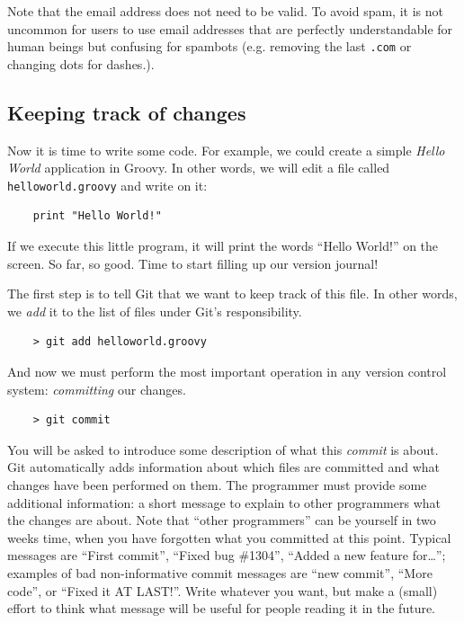 Note that the email address does not need to be valid. To avoid spam,
it is not uncommon for users to use email addresses that are perfectly
understandable for human beings but confusing for spambots
(e.g. removing the last \verb+.com+ or changing dots for dashes.).

\subsection{Keeping track of changes}
\label{sec:keep-track-chang}

Now it is time to write some code. For example, we could create a
simple \emph{Hello World} application in Groovy. In other words, we
will edit a file called \verb+helloworld.groovy+ and write on it:

\begin{verbatim}
    print "Hello World!"
\end{verbatim}

If we execute this little program, it will print the words ``Hello
World!'' on the screen. So far, so good. Time to start filling up our
version journal! 

The first step is to tell Git that we want to keep track of this
file. In other words, we \emph{add} it to the list of files under
Git's responsibility. 

\begin{verbatim}
    > git add helloworld.groovy
\end{verbatim}

And now we must perform the most important operation in any version control
system: \emph{committing} our changes. 

\begin{verbatim}
    > git commit
\end{verbatim}

You will be asked to introduce some description of what this \emph{commit}
is about. Git automatically adds information about which files are
committed and what changes have been performed on them. The programmer
must provide some additional information: a short message to explain
to other programmers what the changes are about. Note that ``other
programmers'' can be yourself in two weeks time, when you have
forgotten what you committed at this point. Typical messages are
``First commit'', ``Fixed bug \#1304'', ``Added a new feature
for\ldots''; examples of bad non-informative commit messages are ``new
commit'', ``More code'', or ``Fixed it AT LAST!''. Write whatever you
want, but make a (small) effort to think what message will be useful
for people reading it in the future.

